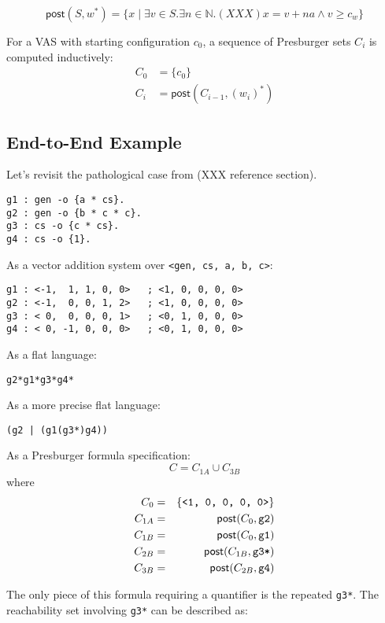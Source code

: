 \documentclass[fullpage, 11pt]{article}
\begin{document}
\[
\mathsf{post}(S, w^*) =
\{x \mid \exists v\in S.
\exists n\in\mathbb{N}. (XXX) x = v + na \land v \geq c_w
\}
\]

For a VAS with starting configuration $c_0$, a sequence of Presburger sets
$C_i$ is computed inductively:
\begin{eqnarray*}
C_0 &= \{c_0\} \\
C_i &= \mathsf{post}(C_{i-1}, (w_i)^*)
\end{eqnarray*}

\subsection{End-to-End Example}

Let's revisit the pathological case from (XXX reference section).

\begin{verbatim}
g1 : gen -o {a * cs}.
g2 : gen -o {b * c * c}.
g3 : cs -o {c * cs}.
g4 : cs -o {1}.
\end{verbatim}

As a vector addition system over \verb|<gen, cs, a, b, c>|:
\begin{verbatim}
g1 : <-1,  1, 1, 0, 0>   ; <1, 0, 0, 0, 0>
g2 : <-1,  0, 0, 1, 2>   ; <1, 0, 0, 0, 0>
g3 : < 0,  0, 0, 0, 1>   ; <0, 1, 0, 0, 0>
g4 : < 0, -1, 0, 0, 0>   ; <0, 1, 0, 0, 0>
\end{verbatim}

As a flat language:
\begin{verbatim}
g2*g1*g3*g4*
\end{verbatim}

As a more precise flat language:
\begin{verbatim}
(g2 | (g1(g3*)g4))
\end{verbatim}

As a Presburger formula specification:
\[
  C = C_{1A} \cup C_{3B}
\]
where
\begin{eqnarray*}
C_0     &=& \{ \verb|<1, 0, 0, 0, 0>| \}\\
C_{1A}  &=& \mathsf{post}(C_0, \verb|g2|)\\
C_{1B}  &=& \mathsf{post}(C_0, \verb|g1|)\\
C_{2B}  &=& \mathsf{post}(C_{1B}, \verb|g3*|)\\
C_{3B}  &=& \mathsf{post}(C_{2B}, \verb|g4|)
\end{eqnarray*}

The only piece of this formula requiring a quantifier is the repeated
\verb|g3*|. The reachability set involving \verb|g3*| can be described as:
\end{document}
